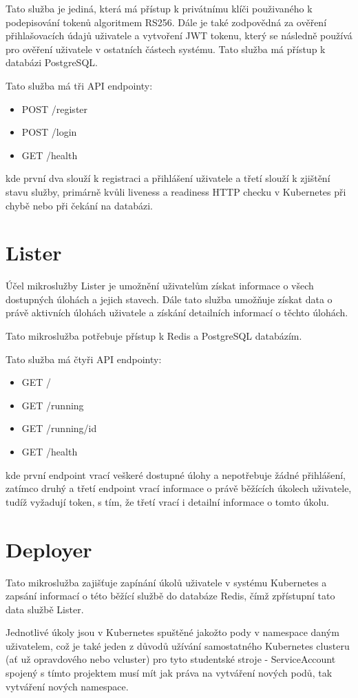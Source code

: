 \documentclass[12pt, a4paper,
oneside,      %
openright
]{report}
\begin{document}
Tato služba je jediná, která má přístup k privátnímu klíči použivaného k podepisování tokenů algoritmem RS256. Dále je také zodpovědná za ověření přihlašovacích údajů uživatele a vytvoření JWT tokenu, který se následně používá pro ověření uživatele v ostatních částech systému. Tato služba má přístup k databázi PostgreSQL.

Tato služba má tři API endpointy:
\begin{itemize}
	\item POST /register
	\item POST /login
	\item GET /health
\end{itemize}
kde první dva slouží k registraci a přihlášení uživatele a třetí slouží k zjištění stavu služby, primárně kvůli liveness a readiness HTTP checku v Kubernetes při chybě nebo při čekání na databázi.

\section{Lister}
Účel mikroslužby Lister je umožnění uživatelům získat informace o všech dostupných úlohách a jejich stavech. Dále tato služba umožňuje získat data o právě aktivních úlohách uživatele a získání detailních informací o těchto úlohách.

Tato mikroslužba potřebuje přístup k Redis a PostgreSQL databázím.

Tato služba má čtyři API endpointy:
\begin{itemize}
	\item GET /
	\item GET /running
	\item GET /running/{id}
	\item GET /health
\end{itemize}
kde první endpoint vrací veškeré dostupné úlohy a nepotřebuje žádné přihlášení, zatímco druhý a třetí endpoint vrací informace o právě běžících úkolech uživatele, tudíž vyžadují token, s tím, že třetí vrací i detailní informace o tomto úkolu.

\section{Deployer}
Tato mikroslužba zajišťuje zapínání úkolů uživatele v systému Kubernetes a zapsání informací o této běžící službě do databáze Redis, čímž zpřístupní tato data službě Lister.

Jednotlivé úkoly jsou v Kubernetes spuštěné jakožto pody v namespace daným uživatelem, což je také jeden z důvodů užívání samostatného Kubernetes clusteru (ať už opravdového nebo vcluster) pro tyto studentské stroje - ServiceAccount  spojený s tímto projektem musí mít jak práva na vytváření nových podů, tak vytváření nových namespace.
\end{document}
